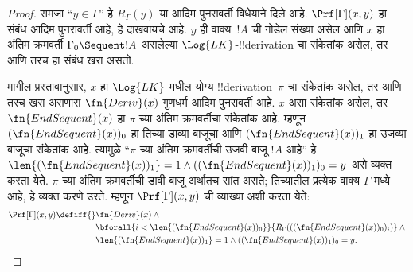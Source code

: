 \documentclass[../../../include/open-logic-section]{subfiles}
\begin{document}
\begin{proof}
समजा ``$y \in \Gamma$'' हे $R_\Gamma(y)$ या आदिम पुनरावर्ती
विधेयाने दिले आहे. $\Prf[\Gamma](x, y)$ हा संबंध आदिम पुनरावर्ती आहे,
हे दाखवायचे आहे. $y$ ही वाक्य~$!A$ ची गोडेल संख्या असेल
आणि $x$ हा अंतिम क्रमवर्ती $\Gamma_0 \Sequent !A$ असलेल्या
$\Log{LK}$-!!{derivation} चा संकेतांक असेल, तर आणि तरच हा संबंध खरा असतो.

मागील प्रस्तावानुसार, $x$ हा $\Log{LK}$ मधील योग्य
!!{derivation}~$\pi$ चा संकेतांक असेल, तर आणि तरच खरा असणारा
$\fn{Deriv}(x)$ गुणधर्म आदिम पुनरावर्ती आहे. $x$ असा संकेतांक असेल,
तर $\fn{EndSequent}(x)$ हा $\pi$ च्या अंतिम क्रमवर्तीचा संकेतांक आहे.
म्हणून $(\fn{EndSequent}(x))_0$ हा तिच्या डाव्या बाजूचा आणि
$(\fn{EndSequent}(x))_1$ हा उजव्या बाजूचा संकेतांक आहे. त्यामुळे
``$\pi$ च्या अंतिम क्रमवर्तीची उजवी बाजू $!A$ आहे'' हे
$\len{(\fn{EndSequent}(x))_1} = 1 \land ((\fn{EndSequent}(x))_1)_0 =
y$ असे व्यक्त करता येते. $\pi$ च्या अंतिम क्रमवर्तीची डावी बाजू
अर्थातच सांत असते; तिच्यातील प्रत्येक वाक्य $\Gamma$ मध्ये आहे,
हे व्यक्त करणे उरते. म्हणून $\Prf[\Gamma](x, y)$ ची व्याख्या अशी करता येते:
\begin{align*}
\Prf[\Gamma](x, y) \defiff {}&
\fn{Deriv}(x) \land {} \\
& \bforall{i <
  \len{(\fn{EndSequent}(x))_0}}{R_\Gamma(((\fn{EndSequent}(x))_0)_i)} \land {}\\
& \len{(\fn{EndSequent}(x))_1} = 1 \land ((\fn{EndSequent}(x))_1)_0 = y.
\end{align*}
\end{proof}
\end{document}
